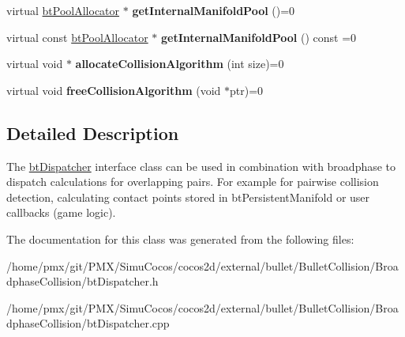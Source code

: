 \begin{DoxyCompactItemize}
\mbox{\label{classbtDispatcher_aa2f5918d1905cd291a10ced30b182c9c}} 
virtual \hyperlink{classbtPoolAllocator}{bt\+Pool\+Allocator} $\ast$ {\bfseries get\+Internal\+Manifold\+Pool} ()=0
\item 
\mbox{\label{classbtDispatcher_a19470efec674c942b691c156dc89df40}} 
virtual const \hyperlink{classbtPoolAllocator}{bt\+Pool\+Allocator} $\ast$ {\bfseries get\+Internal\+Manifold\+Pool} () const =0
\item 
\mbox{\label{classbtDispatcher_a0f0b69ca4c16a66abdabf3575b655e78}} 
virtual void $\ast$ {\bfseries allocate\+Collision\+Algorithm} (int size)=0
\item 
\mbox{\label{classbtDispatcher_a70380f4805e189f34a56fcbf3eab5aaf}} 
virtual void {\bfseries free\+Collision\+Algorithm} (void $\ast$ptr)=0
\end{DoxyCompactItemize}


\subsection{Detailed Description}
The \hyperlink{classbtDispatcher}{bt\+Dispatcher} interface class can be used in combination with broadphase to dispatch calculations for overlapping pairs. For example for pairwise collision detection, calculating contact points stored in bt\+Persistent\+Manifold or user callbacks (game logic). 

The documentation for this class was generated from the following files\+:\begin{DoxyCompactItemize}
\item 
/home/pmx/git/\+P\+M\+X/\+Simu\+Cocos/cocos2d/external/bullet/\+Bullet\+Collision/\+Broadphase\+Collision/bt\+Dispatcher.\+h\item 
/home/pmx/git/\+P\+M\+X/\+Simu\+Cocos/cocos2d/external/bullet/\+Bullet\+Collision/\+Broadphase\+Collision/bt\+Dispatcher.\+cpp\end{DoxyCompactItemize}
